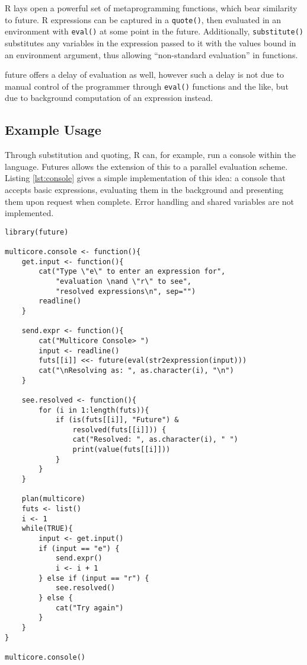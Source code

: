 R lays open a powerful set of metaprogramming functions, which bear
similarity to future. R expressions can be captured in a
\texttt{quote()}, then evaluated in an
environment with \texttt{eval()} at some point
in the future. Additionally,
\texttt{substitute()} substitutes any variables
in the expression passed to it with the values bound in an environment
argument, thus allowing ``non-standard evaluation'' in functions.

future offers a delay of evaluation as well, however such a delay is not
due to manual control of the programmer through
\texttt{eval()} functions and the like, but due
to background computation of an expression instead.

\hypertarget{sec:examples}{%
    \subsection{Example Usage}\label{sec:examples}}

Through substitution and quoting, R can, for example, run a console
within the language. Futures allows the extension of this to a parallel
evaluation scheme. Listing \cref{lst:console} gives a simple
implementation of this idea: a console that accepts basic expressions,
evaluating them in the background and presenting them upon request when
complete. Error handling and shared variables are not implemented.

\begin{listing}
    \begin{verbatim}
library(future)

multicore.console <- function(){
    get.input <- function(){
        cat("Type \"e\" to enter an expression for",
            "evaluation \nand \"r\" to see",
            "resolved expressions\n", sep="")
        readline()
    }

    send.expr <- function(){
        cat("Multicore Console> ")
        input <- readline()
        futs[[i]] <<- future(eval(str2expression(input)))
        cat("\nResolving as: ", as.character(i), "\n")
    }

    see.resolved <- function(){
        for (i in 1:length(futs)){
            if (is(futs[[i]], "Future") &
                resolved(futs[[i]])) {
                cat("Resolved: ", as.character(i), " ")
                print(value(futs[[i]]))
            }
        }
    }

    plan(multicore)
    futs <- list()
    i <- 1
    while(TRUE){
        input <- get.input()
        if (input == "e") {
            send.expr()
            i <- i + 1
        } else if (input == "r") {
            see.resolved()
        } else {
            cat("Try again")
        }
    }
}

multicore.console()
\end{verbatim}
    \caption{Usage of future to implement a basic multicore console}
    \label{lst:console}
\end{listing}

